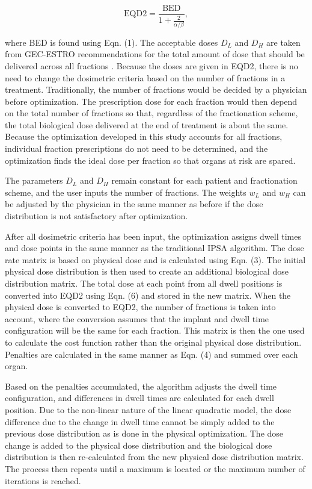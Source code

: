 \documentclass[osajnl,twocolumn,showpacs,superscriptaddress,10pt]{revtex4-1}
\begin{document}
\begin{equation}\label{eq:EQD2}
    \text{EQD2} = \frac{\text{BED}}{1 + \frac{2}{\alpha/\beta}}, 
\end{equation}

where BED is found using Eqn. (1). The acceptable doses $D_L$ and $D_H$ are taken from GEC-ESTRO recommendations for the total amount of dose that should be delivered across all fractions \cite{GECESTRO}. Because the doses are given in EQD2, there is no need to change the dosimetric criteria based on the number of fractions in a treatment. Traditionally, the number of fractions would be decided by a physician before optimization. The prescription dose for each fraction would then depend on the total number of fractions so that, regardless of the fractionation scheme, the total biological dose delivered at the end of treatment is about the same. Because the optimization developed in this study accounts for all fractions, individual fraction prescriptions do not need to be determined, and the optimization finds the ideal dose per fraction so that organs at risk are spared. 

The parameters $D_L$ and $D_H$ remain constant for each patient and fractionation scheme, and the user inputs the number of fractions. The weights $w_L$ and $w_H$ can be adjusted by the physician in the same manner as before if the dose distribution is not satisfactory after optimization. 

After all dosimetric criteria has been input, the optimization assigns dwell times and dose points in the same manner as the traditional IPSA algorithm. The dose rate matrix is based on physical dose and is calculated using Eqn. (3). The initial physical dose distribution is then used to create an additional biological dose distribution matrix. The total dose at each point from all dwell positions is converted into EQD2 using Eqn. (6) and stored in the new matrix. When the physical dose is converted to EQD2, the number of fractions is taken into account, where the conversion assumes that the implant and dwell time configuration will be the same for each fraction. This matrix is then the one used to calculate the cost function rather than the original physical dose distribution. Penalties are calculated in the same manner as Eqn. (4) and summed over each organ. 

Based on the penalties accumulated, the algorithm adjusts the dwell time configuration, and differences in dwell times are calculated for each dwell position. Due to the non-linear nature of the linear quadratic model, the dose difference due to the change in dwell time cannot be simply added to the previous dose distribution as is done in the physical optimization. The dose change is added to the physical dose distribution and the biological dose distribution is then re-calculated from the new physical dose distribution matrix. The process then repeats until a maximum is located or the maximum number of iterations is reached. 
\end{document}
